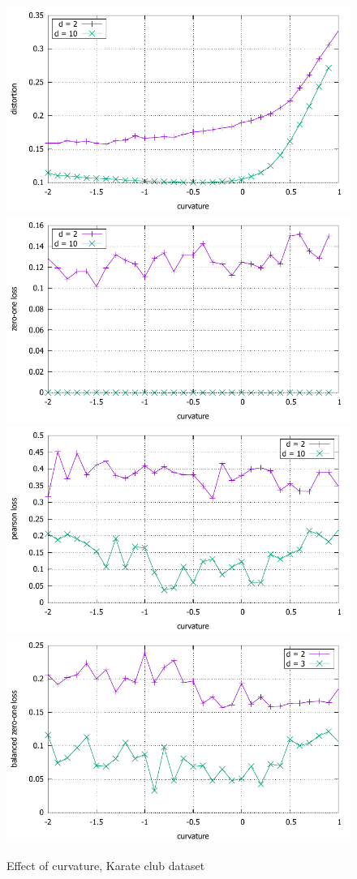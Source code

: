 \documentclass{article} %
\begin{document}
\begin{figure}
    \centering
    \includegraphics[width = 0.49 \textwidth]{karate_distortion.pdf}
    \includegraphics[width = 0.49 \textwidth]{karate_zero_one.pdf}
    \includegraphics[width = 0.49 \textwidth]{karate_pearson.pdf}
    \includegraphics[width = 0.49 \textwidth]{karate_balanced_zero_one.pdf}
    \caption{Effect of curvature, Karate club dataset}
    \label{fig:karate}
\end{figure}
\end{document}
